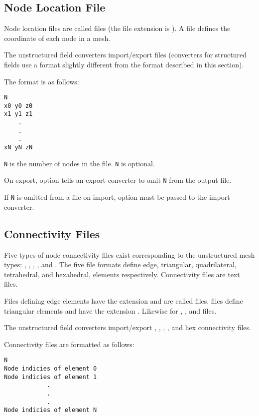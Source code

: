 \subsection{Node Location File}
\label{sec:node_loc_fmt}

Node location files are called  files (the file extension is
).  A  file defines the coordinate of
each node in a mesh.

The unstructured field converters import/export  files
(converters for structured fields use a  format slightly
different from the format described in this section).

The format is as follows:

\begin{verbatim}
N
x0 y0 z0
x1 y1 z1
    .
    .
    .
xN yN zN
\end{verbatim}

\verb|N| is the number of nodes in the file.  \verb|N| is optional.

On export, option  tells an export converter to
omit \verb|N| from the output file.

If \verb|N| is omitted from a file on import, option
 must be passed to the import converter.


\subsection{Connectivity Files}
\label{sec:node_conn_fmt}

Five types of node connectivity files exist corresponding to the
unstructured mesh types: , ,
, , and
.  The five file formats define
edge, triangular, quadrilateral, tetrahedral, and hexahedral,
elements respectively.  Connectivity files are text files.

Files defining edge elements have the extension  and
are called  files.   files define triangular
elements and have the extension .  Likewise for
, , and  files.

The unstructured field converters import/export ,
, , , and hex connectivity
files.

Connectivity files are formatted as follows:

\begin{verbatim}
N
Node indicies of element 0
Node indicies of element 1
            .
            .
            .
Node indicies of element N
\end{verbatim}

